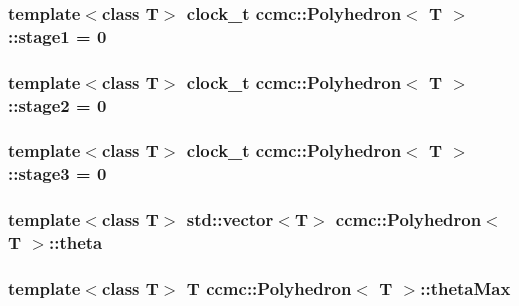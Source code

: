 \hypertarget{classccmc_1_1_polyhedron_aacd29b2b3045dbbc36ef47db91054d48}{
\subsubsection[{stage1}]{\setlength{\rightskip}{0pt plus 5cm}template$<$class T$>$ clock\-\_\-t {\bf ccmc\-::\-Polyhedron}$<$ T $>$\-::stage1 = 0\hspace{0.3cm}{\ttfamily [static]}}}\label{classccmc_1_1_polyhedron_aacd29b2b3045dbbc36ef47db91054d48}
\hypertarget{classccmc_1_1_polyhedron_adb2d70dc6f7af2654dd668bb3940caac}{
\subsubsection[{stage2}]{\setlength{\rightskip}{0pt plus 5cm}template$<$class T$>$ clock\-\_\-t {\bf ccmc\-::\-Polyhedron}$<$ T $>$\-::stage2 = 0\hspace{0.3cm}{\ttfamily [static]}}}\label{classccmc_1_1_polyhedron_adb2d70dc6f7af2654dd668bb3940caac}
\hypertarget{classccmc_1_1_polyhedron_a47a9b8072039bf50deb15bffb7827012}{
\subsubsection[{stage3}]{\setlength{\rightskip}{0pt plus 5cm}template$<$class T$>$ clock\-\_\-t {\bf ccmc\-::\-Polyhedron}$<$ T $>$\-::stage3 = 0\hspace{0.3cm}{\ttfamily [static]}}}\label{classccmc_1_1_polyhedron_a47a9b8072039bf50deb15bffb7827012}
\hypertarget{classccmc_1_1_polyhedron_ac590d3e84e9c6d413b6054de49ac3245}{
\subsubsection[{theta}]{\setlength{\rightskip}{0pt plus 5cm}template$<$class T$>$ std\-::vector$<$T$>$ {\bf ccmc\-::\-Polyhedron}$<$ T $>$\-::theta}}\label{classccmc_1_1_polyhedron_ac590d3e84e9c6d413b6054de49ac3245}
\hypertarget{classccmc_1_1_polyhedron_a4d7f2eaadb816292d2f8fa169f15599e}{
\subsubsection[{theta\-Max}]{\setlength{\rightskip}{0pt plus 5cm}template$<$class T$>$ T {\bf ccmc\-::\-Polyhedron}$<$ T $>$\-::theta\-Max}}\label{classccmc_1_1_polyhedron_a4d7f2eaadb816292d2f8fa169f15599e}
